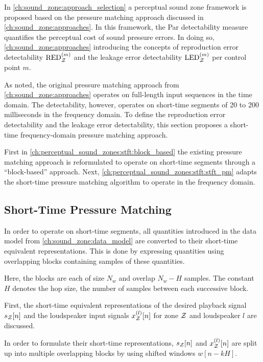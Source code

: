 In \autoref{ch:sound_zone:approach_selection} a perceptual sound zone framework is proposed based on the pressure matching approach discussed in \autoref{ch:sound_zone:approaches}.
In this framework, the Par detectability measure quantifies the perceptual cost of sound pressure errors.
In doing so, \autoref{ch:sound_zone:approaches} introducing the concepts of reproduction error detectability 
$\text{RED}_{\mathcal{Z}}^{(m)}$ and the leakage error detectability $\text{LED}_{\mathcal{Z}}^{(m)}$
per control point $m$.

As noted, the original pressure matching approach from \autoref{ch:sound_zone:approaches} operates on full-length input sequences in the time domain.
The detectability, however, operates on short-time segments of 20 to 200 milliseconds in the frequency domain.
To define the reproduction error detectability and the leakage error detectability, this section proposes a short-time frequency-domain pressure matching approach.

First in \autoref{ch:perceptual_sound_zones:stft:block_based} the existing pressure matching approach is reformulated to operate on short-time segments through a ``block-based'' approach. 
Next, \autoref{ch:perceptual_sound_zones:stft:stft_pm} adapts the short-time pressure matching algorithm to operate in the frequency domain. 

\subsection{Short-Time Pressure Matching}
\label{ch:perceptual_sound_zones:stft:block_based}
In order to operate on short-time segments, all quantities introduced in the data model from \autoref{ch:sound_zone:data_model} are converted to their short-time equivalent representations.
This is done by expressing quantities using overlapping blocks containing samples of these quantities.

Here, the blocks are each of size $N_w$ and overlap $N_w - H$ samples.
The constant $H$ denotes the hop size, the number of samples between each successive block.

First, the short-time equivalent representations of the desired playback signal $s_{\mathcal{Z}}[n]$ and the loudspeaker input
signals $x^{(l)}_{\mathcal{Z}}[n]$ for zone $\mathcal{Z}$ and loudspeaker $l$ are discussed.

In order to formulate their short-time representations, $s_{\mathcal{Z}}[n]$ and $x^{(l)}_{\mathcal{Z}}[n]$ are split up into multiple overlapping blocks by using shifted windows $w[n - kH]$. 

